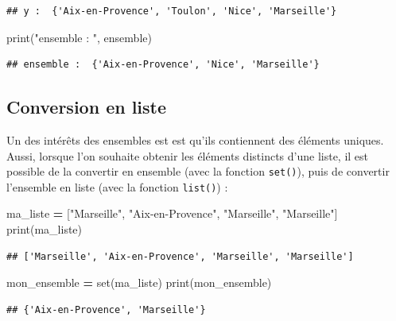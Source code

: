 \documentclass[12pt,]{book}
\newenvironment{Shaded}{\begin{snugshade}}{\end{snugshade}}
\newcommand{\StringTok}[1]{\textcolor[rgb]{0.31,0.60,0.02}{#1}}
\newcommand{\OperatorTok}[1]{\textcolor[rgb]{0.81,0.36,0.00}{\textbf{#1}}}
\newcommand{\BuiltInTok}[1]{#1}
\newcommand{\NormalTok}[1]{#1}
\numberwithin{equation}{section}
\numberwithin{countremarque}{section}
\begin{document}
\begin{lstlisting}
## y :  {'Aix-en-Provence', 'Toulon', 'Nice', 'Marseille'}
\end{lstlisting}

\begin{Shaded}
\begin{Highlighting}[]
\BuiltInTok{print}\NormalTok{(}\StringTok{"ensemble : "}\NormalTok{, ensemble)}
\end{Highlighting}
\end{Shaded}

\begin{lstlisting}
## ensemble :  {'Aix-en-Provence', 'Nice', 'Marseille'}
\end{lstlisting}

\subsection{Conversion en liste}\label{conversion-en-liste}

Un des intérêts des ensembles est est qu'ils contiennent des éléments
uniques. Aussi, lorsque l'on souhaite obtenir les éléments distincts
d'une liste, il est possible de la convertir en ensemble (avec la
fonction \texttt{set()}), puis de convertir l'ensemble en liste (avec la
fonction \texttt{list()}) :

\begin{Shaded}
\begin{Highlighting}[]
\NormalTok{ma_liste }\OperatorTok{=}\NormalTok{ [}\StringTok{"Marseille"}\NormalTok{, }\StringTok{"Aix-en-Provence"}\NormalTok{, }\StringTok{"Marseille"}\NormalTok{, }\StringTok{"Marseille"}\NormalTok{]}
\BuiltInTok{print}\NormalTok{(ma_liste)}
\end{Highlighting}
\end{Shaded}

\begin{lstlisting}
## ['Marseille', 'Aix-en-Provence', 'Marseille', 'Marseille']
\end{lstlisting}

\begin{Shaded}
\begin{Highlighting}[]
\NormalTok{mon_ensemble }\OperatorTok{=} \BuiltInTok{set}\NormalTok{(ma_liste)}
\BuiltInTok{print}\NormalTok{(mon_ensemble)}
\end{Highlighting}
\end{Shaded}

\begin{lstlisting}
## {'Aix-en-Provence', 'Marseille'}
\end{lstlisting}
\end{document}

